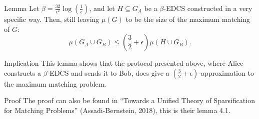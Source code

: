 \documentclass[a4paper]{article}
\begin{document}
\begin{parag}{Lemma}
    Let $\beta = \frac{32}{\epsilon^2} \log\left(\frac{1}{\epsilon}\right)$, and let $H \subseteq G_A$ be a $\beta$-EDCS constructed in a very specific way. Then, still leaving $\mu\left(G\right)$ to be the size of the maximum matching of $G$:
    \[\mu\left(G_A \cup G_B\right) \leq \left(\frac{3}{2} + \epsilon\right) \mu\left(H \cup G_B\right).\]

    \begin{subparag}{Implication}
        This lemma shows that the protocol presented above, where Alice constructs a $\beta$-EDCS and sends it to Bob, does give a $\left(\frac{3}{2} + \epsilon\right)$-approximation to the maximum matching problem.
    \end{subparag}

    \begin{subparag}{Proof}
        The proof can also be found in ``Towards a Unified Theory of Sparsification for Matching Problems'' (Assadi-Bernstein, 2018), this is their lemma 4.1.
    \end{subparag}
\end{parag}
\end{document}
